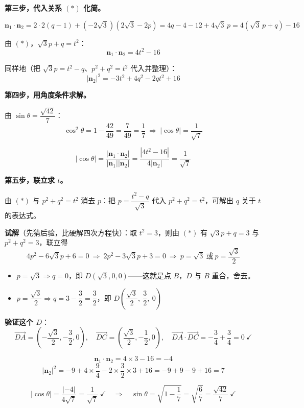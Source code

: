 \textbf{第三步，代入关系 $(\ast)$ 化简。}

\[\boldsymbol n_1\cdot\boldsymbol n_2=2\cdot2(q-1)+\left(-2\sqrt3\right)\left(2\sqrt3-2p\right)=4q-4-12+4\sqrt3\,p=4\left(\sqrt3\,p+q\right)-16\]

由 $(\ast)$，$\sqrt3p+q=t^{2}$：
\[\boldsymbol n_1\cdot\boldsymbol n_2=4t^{2}-16\]

同样地（把 $\sqrt3p=t^{2}-q$、$p^{2}+q^{2}=t^{2}$ 代入并整理）：
\[\left|\boldsymbol n_2\right|^{2}=-3t^{2}+4q^{2}-2qt^{2}+16\]

\textbf{第四步，用角度条件求解。}

由 $\sin\theta=\dfrac{\sqrt{42}}7$：
\[\cos^{2}\theta=1-\frac{42}{49}=\frac7{49}=\frac17\ \Longrightarrow\ \left|\cos\theta\right|=\frac1{\sqrt7}\]

\[\left|\cos\theta\right|=\frac{\left|\boldsymbol n_1\cdot\boldsymbol n_2\right|}{\left|\boldsymbol n_1\right|\left|\boldsymbol n_2\right|}=\frac{\left|4t^{2}-16\right|}{4\left|\boldsymbol n_2\right|}=\frac1{\sqrt7}\]

\textbf{第五步，联立求 $t$。}

由 $(\ast)$ 与 $p^{2}+q^{2}=t^{2}$ 消去 $p$：把 $p=\dfrac{t^{2}-q}{\sqrt3}$ 代入 $p^{2}+q^{2}=t^{2}$，可解出 $q$ 关于 $t$ 的表达式。

\textbf{试解}（先猜后验，比硬解四次方程快）：取 $t^{2}=3$，则由 $(\ast)$ 有 $\sqrt3p+q=3$ 与 $p^{2}+q^{2}=3$，联立得
\[4p^{2}-6\sqrt3p+6=0\ \Longrightarrow\ 2p^{2}-3\sqrt3p+3=0\ \Longrightarrow\ p=\sqrt3\ \text{或}\ p=\frac{\sqrt3}2\]

\begin{itemize}
\item $p=\sqrt3\Rightarrow q=0$，即 $D\left(\sqrt3,0,0\right)$——这就是点 $B$，$D$ 与 $B$ 重合，舍去。
\item $p=\dfrac{\sqrt3}2\Rightarrow q=3-\dfrac32=\dfrac32$，即 $D\left(\dfrac{\sqrt3}2,\ \dfrac32,\ 0\right)$ 
\end{itemize}

\textbf{验证这个 $D$}：
\[\overrightarrow{DA}=\left(-\frac{\sqrt3}2,-\frac32,0\right),\quad \overrightarrow{DC}=\left(\frac{\sqrt3}2,-\frac12,0\right),\quad \overrightarrow{DA}\cdot\overrightarrow{DC}=-\frac34+\frac34=0\ \checkmark\]

\[\boldsymbol n_1\cdot\boldsymbol n_2=4\times3-16=-4\]
\[\left|\boldsymbol n_2\right|^{2}=-9+4\times\frac94-2\times\frac32\times3+16=-9+9-9+16=7\]

\[\left|\cos\theta\right|=\frac{|-4|}{4\sqrt7}=\frac1{\sqrt7}\ \checkmark\quad\Longrightarrow\quad\sin\theta=\sqrt{1-\frac17}=\sqrt{\frac67}=\frac{\sqrt{42}}7\ \checkmark\]

